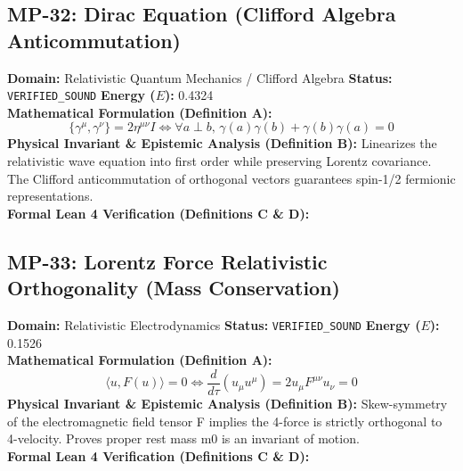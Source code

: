 \subsection{MP-32: Dirac Equation (Clifford Algebra Anticommutation)}
\textbf{Domain:} Relativistic Quantum Mechanics / Clifford Algebra \hfill \textbf{Status:} \texttt{VERIFIED\_SOUND} \hfill \textbf{Energy ($E$):} 0.4324\\
\textbf{Mathematical Formulation (Definition A):}
\begin{equation*}
\{\gamma^\mu, \gamma^\nu\} = 2 \eta^{\mu\nu} I \iff \forall a \perp b, \, \gamma(a)\gamma(b) + \gamma(b)\gamma(a) = 0
\end{equation*}
\textbf{Physical Invariant \& Epistemic Analysis (Definition B):}
Linearizes the relativistic wave equation into first order while preserving Lorentz covariance. The Clifford anticommutation of orthogonal vectors guarantees spin-1/2 fermionic representations.\\

\textbf{Formal Lean 4 Verification (Definitions C \& D):}


\vspace{1em}
\subsection{MP-33: Lorentz Force Relativistic Orthogonality (Mass Conservation)}
\textbf{Domain:} Relativistic Electrodynamics \hfill \textbf{Status:} \texttt{VERIFIED\_SOUND} \hfill \textbf{Energy ($E$):} 0.1526\\
\textbf{Mathematical Formulation (Definition A):}
\begin{equation*}
\langle u, F(u) \rangle = 0 \iff \frac{d}{d\tau}(u_\mu u^\mu) = 2 u_\mu F^{\mu\nu} u_\nu = 0
\end{equation*}
\textbf{Physical Invariant \& Epistemic Analysis (Definition B):}
Skew-symmetry of the electromagnetic field tensor F implies the 4-force is strictly orthogonal to 4-velocity. Proves proper rest mass m0 is an invariant of motion.\\

\textbf{Formal Lean 4 Verification (Definitions C \& D):}


\vspace{1em}
